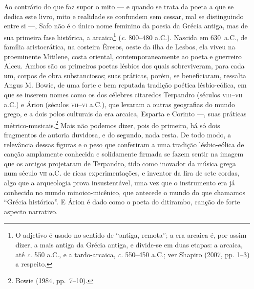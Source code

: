 Ao contrário do que faz supor o mito --- e quando se trata da poeta a que se
dedica este livro, mito e realidade se confundem sem cessar, mal se
distinguindo entre si ---, Safo não é o único nome feminino da poesia da Grécia
antiga, mas de sua primeira fase histórica, a arcaica\footnote{ O adjetivo é
usado no sentido de “antiga, remota”; a era arcaica é, por assim dizer, a mais
antiga da Grécia antiga, e divide-se em duas etapas: a arcaica, até \textit{c.}
550 a.C., e a tardo-arcaica, \textit{c.} 550--450 a.C.; ver Shapiro (2007, pp.
1--3) a respeito.} (\textit{c.} 800--480 a.C.). Nascida em 630~a.C., de família
aristocrática, na costeira Êresos, oeste da ilha de Lesbos, ela viveu na
proeminente Mitilene, costa oriental, contemporaneamente ao poeta e guerreiro
Alceu. Ambos são os primeiros poetas lésbios dos quais sobreviveram, para cada
um, corpos de obra substanciosos; suas práticas, porém, se beneficiaram,
ressalta Angus M. Bowie, de uma forte e bem reputada tradição
poética lésbio-eólica, em que se inserem nomes como os dos célebres citaredos
Terpandro (séculos \textsc{viii}--\textsc{vii} a.C.) e Árion (séculos
\textsc{vii}--\textsc{vi} a.C.), que levaram a
outras geografias do mundo grego, e a dois polos culturais da era arcaica,
Esparta e Corinto ---, suas práticas métrico-musicais.\footnote{ Bowie (1984,
pp.~7--10).} Mais não podemos dizer,
pois do primeiro, há só dois fragmentos de autoria duvidosa, e do segundo, nada
resta. De todo modo, a relevância dessas figuras e o peso que conferiram a uma
tradição lésbio-eólica de canção amplamente conhecida e solidamente firmada se
fazem sentir na imagem que os antigos projetaram de Terpandro, tido como
inovador da música grega num século \textsc{vii} a.C. de ricas experimentações, e
inventor da lira de sete cordas, algo que a arqueologia prova insustentável,
uma vez que o instrumento era já conhecido no mundo minoico-micênico, que
antecede o mundo do que chamamos “Grécia histórica”. E Árion é dado como o
poeta do ditirambo, canção de forte aspecto narrativo.


